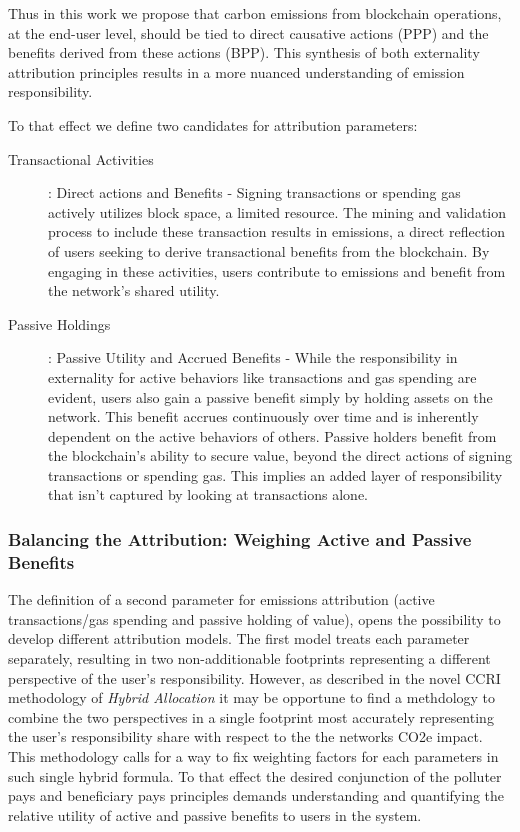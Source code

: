 \documentclass[11pt]{report}
\begin{document}
Thus in this work we propose that carbon emissions from blockchain operations, at the end-user level, should be tied to direct causative actions (\ac{PPP}) and the benefits derived from these actions (\ac{BPP}). This synthesis of both externality attribution principles results in a more nuanced understanding of emission responsibility.

To that effect we define two candidates for attribution parameters:

\begin{description}
    \item [Transactional Activities]: Direct actions and Benefits - Signing transactions or spending gas actively utilizes block space, a limited resource. The mining and validation process to include these transaction results in emissions, a direct reflection of users seeking to derive transactional benefits from the blockchain. By engaging in these activities, users contribute to emissions and benefit from the network's shared utility.
    \item [Passive Holdings]: Passive Utility and Accrued Benefits - While the responsibility in externality for active behaviors like transactions and gas spending are evident, users also gain a passive benefit simply by holding assets on the network. This benefit accrues continuously over time and is inherently dependent on the active behaviors of others. Passive holders benefit from the blockchain's ability to secure value, beyond the direct actions of signing transactions or spending gas. This implies an added layer of responsibility that isn't captured by looking at transactions alone.

\end{description}

\subsubsection*{Balancing the Attribution: Weighing Active and Passive Benefits}
The definition of a second parameter for emissions attribution (active transactions/gas spending and passive holding of value), opens the possibility to develop different attribution models. The first model treats each parameter separately, resulting in two non-additionable footprints representing a different perspective of the user's responsibility. However, as described in the novel CCRI methodology of \textit{Hybrid Allocation} it may be opportune to find a methdology to combine the two perspectives in a single footprint most accurately representing the user's responsibility share with respect to the the networks CO2e impact. This methodology calls for a way to fix weighting factors for each parameters in such single hybrid formula. To that effect the desired conjunction of the polluter pays and beneficiary pays principles demands understanding and quantifying the relative utility of active and passive benefits to users in the system.
\end{document}
